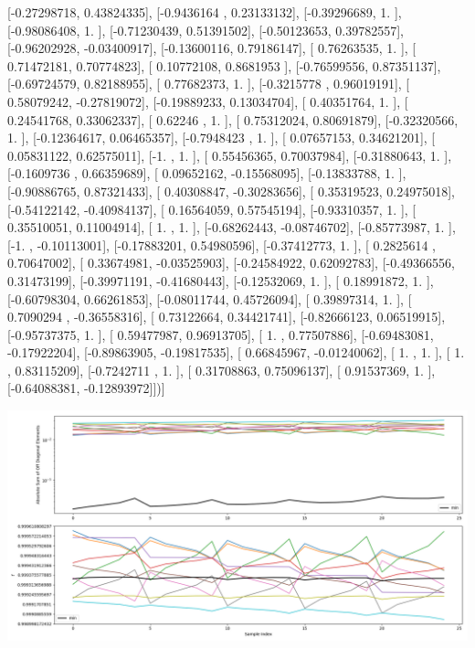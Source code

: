 \documentclass{article}
\begin{document}
       [-0.27298718,  0.43824335],
       [-0.9436164 ,  0.23133132],
       [-0.39296689,  1.        ],
       [-0.98086408,  1.        ],
       [-0.71230439,  0.51391502],
       [-0.50123653,  0.39782557],
       [-0.96202928, -0.03400917],
       [-0.13600116,  0.79186147],
       [ 0.76263535,  1.        ],
       [ 0.71472181,  0.70774823],
       [ 0.10772108,  0.8681953 ],
       [-0.76599556,  0.87351137],
       [-0.69724579,  0.82188955],
       [ 0.77682373,  1.        ],
       [-0.3215778 ,  0.96019191],
       [ 0.58079242, -0.27819072],
       [-0.19889233,  0.13034704],
       [ 0.40351764,  1.        ],
       [ 0.24541768,  0.33062337],
       [ 0.62246   ,  1.        ],
       [ 0.75312024,  0.80691879],
       [-0.32320566,  1.        ],
       [-0.12364617,  0.06465357],
       [-0.7948423 ,  1.        ],
       [ 0.07657153,  0.34621201],
       [ 0.05831122,  0.62575011],
       [-1.        ,  1.        ],
       [ 0.55456365,  0.70037984],
       [-0.31880643,  1.        ],
       [-0.1609736 ,  0.66359689],
       [ 0.09652162, -0.15568095],
       [-0.13833788,  1.        ],
       [-0.90886765,  0.87321433],
       [ 0.40308847, -0.30283656],
       [ 0.35319523,  0.24975018],
       [-0.54122142, -0.40984137],
       [ 0.16564059,  0.57545194],
       [-0.93310357,  1.        ],
       [ 0.35510051,  0.11004914],
       [ 1.        ,  1.        ],
       [-0.68262443, -0.08746702],
       [-0.85773987,  1.        ],
       [-1.        , -0.10113001],
       [-0.17883201,  0.54980596],
       [-0.37412773,  1.        ],
       [ 0.2825614 ,  0.70647002],
       [ 0.33674981, -0.03525903],
       [-0.24584922,  0.62092783],
       [-0.49366556,  0.31473199],
       [-0.39971191, -0.41680443],
       [-0.12532069,  1.        ],
       [ 0.18991872,  1.        ],
       [-0.60798304,  0.66261853],
       [-0.08011744,  0.45726094],
       [ 0.39897314,  1.        ],
       [ 0.7090294 , -0.36558316],
       [ 0.73122664,  0.34421741],
       [-0.82666123,  0.06519915],
       [-0.95737375,  1.        ],
       [ 0.59477987,  0.96913705],
       [ 1.        ,  0.77507886],
       [-0.69483081, -0.17922204],
       [-0.89863905, -0.19817535],
       [ 0.66845967, -0.01240062],
       [ 1.        ,  1.        ],
       [ 1.        ,  0.83115209],
       [-0.7242711 ,  1.        ],
       [ 0.31708863,  0.75096137],
       [ 0.91537369,  1.        ],
       [-0.64088381, -0.12893972]])]
\begin{center}
\includegraphics[scale=.9]{report_pickled_controls224/control_dpn_all.png}

\end{center}
\end{document}
